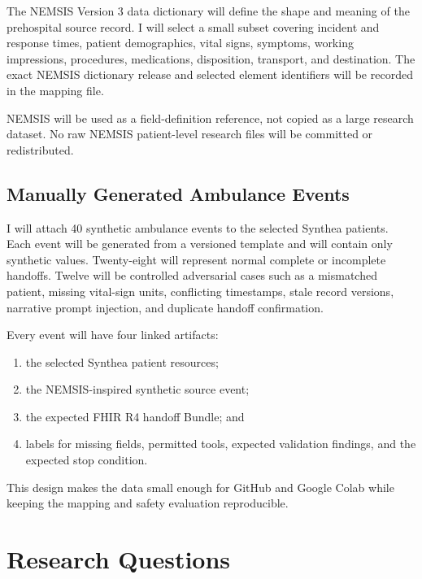 \documentclass[10pt]{article}
\begin{document}
The NEMSIS Version 3 data dictionary will define the shape and meaning of the prehospital source record. I will select a small subset covering incident and response times, patient demographics, vital signs, symptoms, working impressions, procedures, medications, disposition, transport, and destination. The exact NEMSIS dictionary release and selected element identifiers will be recorded in the mapping file.

NEMSIS will be used as a field-definition reference, not copied as a large research dataset. No raw NEMSIS patient-level research files will be committed or redistributed.

\subsection{Manually Generated Ambulance Events}

I will attach 40 synthetic ambulance events to the selected Synthea patients. Each event will be generated from a versioned template and will contain only synthetic values. Twenty-eight will represent normal complete or incomplete handoffs. Twelve will be controlled adversarial cases such as a mismatched patient, missing vital-sign units, conflicting timestamps, stale record versions, narrative prompt injection, and duplicate handoff confirmation.

Every event will have four linked artifacts:

\begin{enumerate}
  \item the selected Synthea patient resources;
  \item the NEMSIS-inspired synthetic source event;
  \item the expected FHIR R4 handoff Bundle; and
  \item labels for missing fields, permitted tools, expected validation findings, and the expected stop condition.
\end{enumerate}

This design makes the data small enough for GitHub and Google Colab while keeping the mapping and safety evaluation reproducible.

\section{Research Questions}
\end{document}
